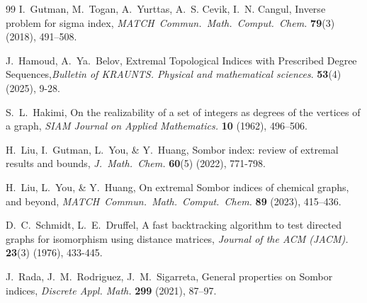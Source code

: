 \documentclass[12pt, a4paper]{article}
\begin{document}
\begin{thebibliography}{99}
 I.~Gutman, M.~Togan, A.~Yurttas, A.~S. Cevik, I.~N. Cangul, Inverse problem for sigma index,
{\em MATCH~Commun.~Math.~Comput.~Chem.} \textbf{79}(3) (2018), 491–508.

 J.~Hamoud, A.~Ya.~Belov, Extremal Topological Indices with Prescribed Degree Sequences,{\em  Bulletin of KRAUNTS. Physical and mathematical sciences}. \textbf{53}(4) (2025), 9-28.

 S.~L.~Hakimi, On the realizability of a set of integers as degrees of the vertices of a graph, {\em SIAM Journal on Applied Mathematics.} \textbf{10} (1962), 496–506.

 H.~Liu, I.~Gutman, L.~You, \& Y.~Huang, Sombor index: review of extremal results and bounds, {\em J.~Math.~Chem.} \textbf{60}(5) (2022), 771-798.

 H.~Liu, L.~You, \& Y.~Huang, On extremal Sombor indices of chemical graphs, and beyond, {\em MATCH~Commun.~Math.~Comput.~Chem.} \textbf{89} (2023), 415--436.

 D.~C.~Schmidt, L.~E.~Druffel, A fast backtracking algorithm to test directed graphs for isomorphism using distance matrices, {\em Journal of the ACM (JACM).} \textbf{23}(3) (1976), 433-445.

 J.~Rada, J.~M.~Rodriguez, J.~M.~Sigarreta, General properties on Sombor indices, {\em Discrete Appl. Math.} \textbf{299} (2021), 87–97.


\end{thebibliography}
 
\end{document}
